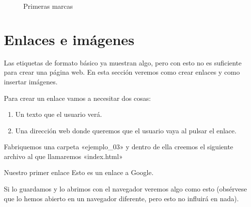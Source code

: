 \documentclass[a4paper,12pt,spanish]{sphinxmanual}
\begin{document}
\begin{figure}[htbp]
\centering
\capstart

\noindent{}
\caption{Primeras marcas}\label{\detokenize{index:id13}}\end{figure}


\chapter{Enlaces e imágenes}
\label{\detokenize{index:enlaces-e-imagenes}}
Las etiquetas de formato básico ya muestran algo, pero con esto no es suficiente para crear una página web. En esta sección veremos como crear enlaces y como insertar imágenes.

Para crear un enlace vamos a necesitar dos cosas:
\begin{enumerate}
\def\theenumi{\arabic{enumi}}
\def\labelenumi{\theenumi .}
\makeatletter\def\p@enumii{\p@enumi \theenumi .}\makeatother
\item {} 
Un texto que el usuario verá.

\item {} 
Una dirección web donde queremos que el usuario vaya al pulsar el enlace.

\end{enumerate}

Fabriquemos una carpeta «ejemplo\_03» y dentro de ella creemos el siguiente archivo al que llamaremos «index.html»

%
\begin{sphinxVerbatim}[commandchars=\\\{\}]
    Nuestro primer enlace
     Esto es un enlace a Google.
\end{sphinxVerbatim}

Si lo guardamos y lo abrimos con el navegador veremos algo como esto (obsérvese que lo hemos abierto en un navegador diferente, pero esto no influirá en nada).
\end{document}
